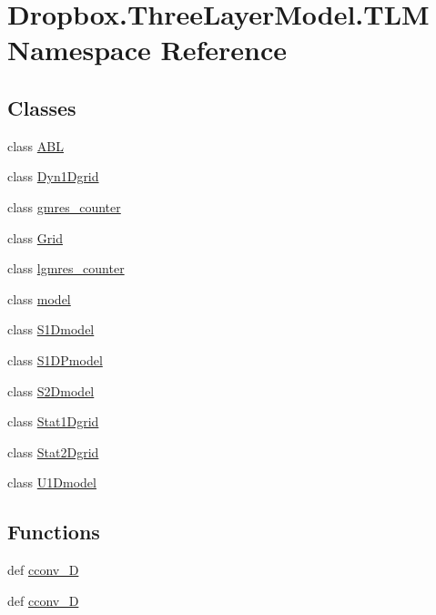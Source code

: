 \hypertarget{namespaceDropbox_1_1ThreeLayerModel_1_1TLM}{\section{Dropbox.\+Three\+Layer\+Model.\+T\+L\+M Namespace Reference}
\label{namespaceDropbox_1_1ThreeLayerModel_1_1TLM}
}
\subsection*{Classes}
\begin{DoxyCompactItemize}
\item 
class \hyperlink{classDropbox_1_1ThreeLayerModel_1_1TLM_1_1ABL}{A\+B\+L}
\item 
class \hyperlink{classDropbox_1_1ThreeLayerModel_1_1TLM_1_1Dyn1Dgrid}{Dyn1\+Dgrid}
\item 
class \hyperlink{classDropbox_1_1ThreeLayerModel_1_1TLM_1_1gmres__counter}{gmres\+\_\+counter}
\item 
class \hyperlink{classDropbox_1_1ThreeLayerModel_1_1TLM_1_1Grid}{Grid}
\item 
class \hyperlink{classDropbox_1_1ThreeLayerModel_1_1TLM_1_1lgmres__counter}{lgmres\+\_\+counter}
\item 
class \hyperlink{classDropbox_1_1ThreeLayerModel_1_1TLM_1_1model}{model}
\item 
class \hyperlink{classDropbox_1_1ThreeLayerModel_1_1TLM_1_1S1Dmodel}{S1\+Dmodel}
\item 
class \hyperlink{classDropbox_1_1ThreeLayerModel_1_1TLM_1_1S1DPmodel}{S1\+D\+Pmodel}
\item 
class \hyperlink{classDropbox_1_1ThreeLayerModel_1_1TLM_1_1S2Dmodel}{S2\+Dmodel}
\item 
class \hyperlink{classDropbox_1_1ThreeLayerModel_1_1TLM_1_1Stat1Dgrid}{Stat1\+Dgrid}
\item 
class \hyperlink{classDropbox_1_1ThreeLayerModel_1_1TLM_1_1Stat2Dgrid}{Stat2\+Dgrid}
\item 
class \hyperlink{classDropbox_1_1ThreeLayerModel_1_1TLM_1_1U1Dmodel}{U1\+Dmodel}
\end{DoxyCompactItemize}
\subsection*{Functions}
\begin{DoxyCompactItemize}
\item 
def \hyperlink{namespaceDropbox_1_1ThreeLayerModel_1_1TLM_a9ce9a00e3c82750eeadaac3c9eb1e9e4}{cconv\+\_\+D}
\item 
def \hyperlink{namespaceDropbox_1_1ThreeLayerModel_1_1TLM_a6f267344ab869627bd8558b3c15267b2}{cconv\+\_\+D}
\end{DoxyCompactItemize}
